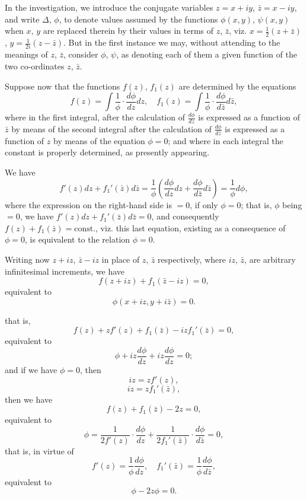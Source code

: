 \documentclass[11pt,a4paper]{book}
\begin{document}
In the investigation, we introduce the conjugate variables $z = x + iy$, $\bar{z} = x - iy$, and write $\Delta$, $\phi$, to denote values assumed by the functions $\phi(x, y)$, $\psi(x, y)$ when $x$, $y$ are replaced therein by their values in terms of $z$, $\bar{z}$, viz. $x = \frac{1}{2}(z + \bar{z})$, $y = \frac{1}{2i}(z - \bar{z})$. But in the first instance we may, without attending to the meanings of $z$, $\bar{z}$, consider $\phi$, $\psi$, as denoting each of them a given function of the two co-ordinates $z$, $\bar{z}$.

Suppose now that the functions $f(z)$, $f_1(z)$ are determined by the equations
\[
f(z) = \int \frac{1}{\phi} \cdot \frac{d\phi}{dz}dz, \quad f_1(z) = \int \frac{1}{\phi} \cdot \frac{d\phi}{d\bar{z}}d\bar{z},
\]
where in the first integral, after the calculation of $\frac{d\phi}{dz}$ is expressed as a function of $\bar{z}$ by means of the second integral after the calculation of $\frac{d\phi}{d\bar{z}}$ is expressed as a function of $z$ by means of the equation $\phi = 0$; and where in each integral the constant is properly determined, as presently appearing.

We have
\[
f'(z) dz + f_1'(\bar{z}) d \bar{z} = \frac{1}{\phi} \left( \frac{d \phi}{d z} dz + \frac{d \phi}{d \bar{z}} d \bar{z} \right) = \frac{1}{\phi} d \phi,
\]
where the expression on the right-hand side is $= 0$, if only $\phi = 0$; that is, $\phi$ being $= 0$, we have $f'(z) dz + f_1'(\bar{z}) d \bar{z} = 0$, and consequently $f(z) + f_1(\bar{z}) = \text{const.}$, viz. this last equation, existing as a consequence of $\phi = 0$, is equivalent to the relation $\phi = 0$.

Writing now $z + iz$, $\bar{z} - iz$ in place of $z$, $\bar{z}$ respectively, where $iz$, $\bar{z}$, are arbitrary infinitesimal increments, we have
\[
f(z + iz) + f_1(\bar{z} - iz) = 0,
\]
equivalent to
\[
\phi (x + i z, y + i\bar{z}) = 0.
\]

that is,
\[
f(z) + zf'(z) + f_1(\bar{z}) - i z f_1'(\bar{z}) = 0,
\]
equivalent to
\[
\phi + i z \frac{d\phi}{dz} + i z \frac{d \phi}{dz} = 0;
\]
and if we have $\phi = 0$, then
\[
i z = z f'(z),
\]
\[
i z = z f_1'(\bar{z}),
\]
then we have
\[
f(z) + f_1(\bar{z}) - 2z = 0,
\]
equivalent to
\[
\phi = \frac{1}{2 f'(z)} \cdot \frac{d \phi}{dz} + \frac{1}{2 f_1'(\bar{z})} \cdot \frac{d \phi}{d \bar{z}} = 0,
\]
that is, in virtue of
\[
f'(z) = \frac{1}{\phi} \frac{d \phi}{d z}, \quad f_1'(\bar{z}) = \frac{1}{\phi} \frac{d \phi}{d \bar{z}},
\]
equivalent to
\[
\phi - 2 z \phi = 0.
\]
\end{document}
